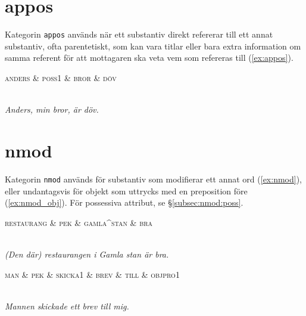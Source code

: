 \documentclass[11pt,a4paper]{article}
\begin{document}
\section{appos}
Kategorin \texttt{appos} används när ett substantiv direkt refererar till ett annat substantiv, ofta parentetiskt, som kan vara titlar eller bara extra information om samma referent för att mottagaren ska veta vem som refereras till (\ref{ex:appos}).

\begin{example}
\label{ex:appos}
\begin{dependency}[theme = simple]
   \begin{deptext}[column sep=1em]
      \textsc{anders} \& \textsc{poss1} \& \textsc{bror} \& \textsc{döv} \\
   \end{deptext}
\end{dependency}
\\
\textit{Anders, min bror, är döv.}
\end{example}

\section{nmod}
\label{sec:nmod}
Kategorin \texttt{nmod} används för substantiv som modifierar ett annat ord (\ref{ex:nmod}), eller undantagsvis för objekt som uttrycks med en preposition före (\ref{ex:nmod_obj}). För possessiva attribut, se §\ref{subsec:nmod:poss}.

\begin{example}
\label{ex:nmod}
\begin{dependency}[theme = simple]
   \begin{deptext}[column sep=1em]
      \textsc{restaurang} \& \textsc{pek} \& \textsc{gamla{\string^}stan} \& \textsc{bra} \\
   \end{deptext}
\end{dependency}
\\
\textit{(Den där) restaurangen i Gamla stan är bra.}
\end{example}

\begin{example}
\label{ex:nmod_obj}
\begin{dependency}[theme = simple]
   \begin{deptext}[column sep=1em]
      \textsc{man} \& \textsc{pek} \& \textsc{skicka1} \& \textsc{brev} \& \textsc{till} \& \textsc{objpro1} \\
   \end{deptext}
\end{dependency}
\\
\textit{Mannen skickade ett brev till mig.}
\end{example}
\end{document}
